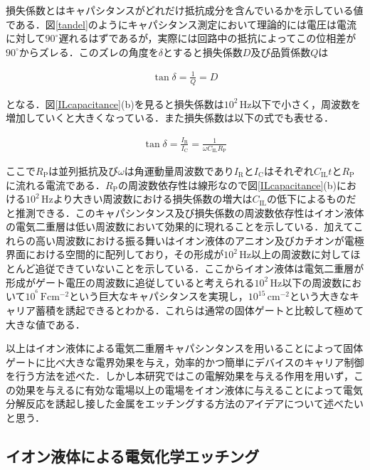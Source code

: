 損失係数とはキャパシタンスがどれだけ抵抗成分を含んでいるかを示している値である．図\ref{tandel}のようにキャパシタンス測定において理論的には電圧は電流に対して$90^{\circ}$遅れるはずであるが，実際には回路中の抵抗によってこの位相差が$90^{\circ}$からズレる．このズレの角度を$\delta$とすると損失係数$D$及び品質係数$Q$は

\begin{eqnarray}
\tan\delta = \frac{1}{Q} = D
\label{eq:tandel}
\end{eqnarray}

となる．図\ref{ILcapacitance}(b)を見ると損失係数は$10^{2}\,\mathrm{Hz}$以下で小さく，周波数を増加していくと大きくなっている．また損失係数は以下の式でも表せる．


\begin{eqnarray}
\tan\delta = \frac{I_{\mathrm{R}}}{I_{\mathrm{C}} }= \frac{1}{\omega C_{\mathrm{IL}}R_{\mathrm{P}}}
\label{eq:tandel2}
\end{eqnarray}

ここで$R_{\mathrm{P}}$は並列抵抗及び$\omega$は角運動量周波数であり$I_{\mathrm{R}}$と$I_{\mathrm{C}}$はそれぞれ$C_{\mathrm{IL}}t$と$R_{\mathrm{P}}$に流れる電流である．$R_{\mathrm{P}}$の周波数依存性は線形なので図\ref{ILcapacitance}(b)における$10^{2}\,\mathrm{Hz}$より大きい周波数における損失係数の増大は$C_{\mathrm{IL}}$の低下によるものだと推測できる．このキャパシンタンス及び損失係数の周波数依存性はイオン液体の電気二重層は低い周波数において効果的に現れることを示している．加えてこれらの高い周波数における振る舞いはイオン液体のアニオン及びカチオンが電極界面における空間的に配列しており，その形成が$10^{2}\,\mathrm{Hz}$以上の周波数に対してほとんど追従できていないことを示している．ここからイオン液体は電気二重層が形成がゲート電圧の周波数に追従していると考えられる$10^{2}\,\mathrm{Hz}$以下の周波数において$10^{^6}\,\mathrm{Fcm^{-2}}$という巨大なキャパシタンスを実現し，$10^{15}\,\mathrm{cm^{-2}}$という大きなキャリア蓄積を誘起できるとわかる．これらは通常の固体ゲートと比較して極めて大きな値である．




以上はイオン液体による電気二重層キャパシンタンスを用いることによって固体ゲートに比べ大きな電界効果を与え，効率的かつ簡単にデバイスのキャリア制御を行う方法を述べた．しかし本研究ではこの電解効果を与える作用を用いず，この効果を与えるに有効な電場以上の電場をイオン液体に与えることによって電気分解反応を誘起し接した金属をエッチングする方法のアイデアについて述べたいと思う．

\subsection{イオン液体による電気化学エッチング}


